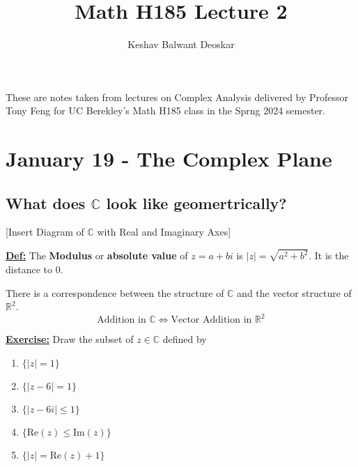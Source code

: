 \documentclass{article}
\title{Math H185 Lecture 2}
\author{Keshav Balwant Deoskar}
\newcommand{\R}{\mathbb{R}}
\newcommand{\C}{\mathbb{C}}
\newcommand{\defn}{\underline{\textbf{Def:}}}
\begin{document}
\maketitle

These are notes taken from lectures on Complex Analysis delivered by Professor Tony Feng for UC Berekley's Math H185 class in the Sprng 2024 semester.

\tableofcontents

\pagebreak

\section{January 19 - The Complex Plane}

\vskip 0.5cm

\subsection{What does $\C$ look like geomertrically?}

[Insert Diagram of $\C$ with Real and Imaginary Axes]

\vskip 0.5cm
\defn\; The \textbf{Modulus} or \textbf{absolute value} of $z = a + bi$ is $|z| = \sqrt{a^2 + b^2}$. It is the distance to $0$.

\vskip 0.5cm
There is a correspondence between the structure of $\C$ and the vector structure of $\R^2$.
\[ \text{Addition in $\C$} \iff \text{Vector Addition in $\R^2$} \]

\vskip 0.5cm
\underline{\textbf{Exercise:}} Draw the subset of $z \in \C$ defined by 
\begin{enumerate}
  \item $\{ |z| = 1 \}$
  \item $\{ |z - 6| = 1 \}$
  \item $\{ |z - 6i| \leq 1 \}$
  \item $\{ \text{Re}(z) \leq \text{Im}(z) \}$
  \item $\{ |z| = \text{Re}(z) + 1 \}$
\end{enumerate}
\end{document}
